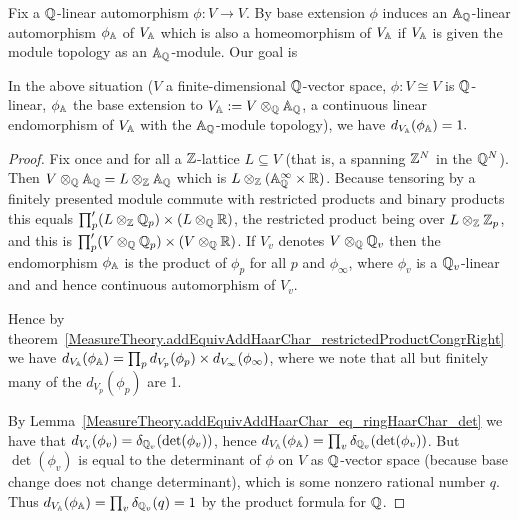  Fix a $\mathbb{Q}$-linear automorphism $\phi:V\to V$. By base extension $\phi$ induces
  an $\mathbb{A}_{\mathbb{Q}}$-linear automorphism $\phi_{\mathbb{A}}$ of $V_{\mathbb{A}}$ which is also a homeomorphism of $V_{\mathbb{A}}$
  if $V_{\mathbb{A}}$ is given the module topology as an $\mathbb{A}_{\mathbb{Q}}$-module. Our goal is

  \begin{theorem}
    \label{MeasureTheory.addHaarScalarFactor_tensor_adeles_eq_one}
    \leanok
    In the above situation ($V$ a finite-dimensional $\mathbb{Q}$-vector space, $\phi:V\cong V$ is
    $\mathbb{Q}$-linear, $\phi_{\mathbb{A}}$ the base extension to $V_{\mathbb{A}}:=V\otimes_{\mathbb{Q}}{\mathbb{A}_{\mathbb{Q}}}$, a continuous linear
    endomorphism of $V_{\mathbb{A}}$ with the $\mathbb{A}_{\mathbb{Q}}$-module topology), we have $d_{V_{\mathbb{A}}}(\phi_{\mathbb{A}})=1.$
  \end{theorem}
  \begin{proof}
    Fix once and for all a $\mathbb{Z}$-lattice $L\subseteq V$
    (that is, a spanning $\mathbb{Z}^N$ in the $\mathbb{Q}^N$). Then $V\otimes_{\mathbb{Q}}\mathbb{A}_{\mathbb{Q}}=L\otimes_{\mathbb{Z}}\mathbb{A}_{\mathbb{Q}}$
    which is $L\otimes_{\mathbb{Z}}(\mathbb{A}_{\mathbb{Q}}^\infty\times\mathbb{R})$.
    Because tensoring by a finitely presented module commute with restricted products and binary
    products this equals $\prod'_p(L\otimes_{\mathbb{Z}}\mathbb{Q}_p)\times(L\otimes_{\mathbb{Q}}\mathbb{R})$, the restricted
    product being over $L\otimes_{\mathbb{Z}}\mathbb{Z}_p$, and this is $\prod'_p(V\otimes_{\mathbb{Q}}\mathbb{Q}_p)\times(V\otimes_{\mathbb{Q}}\mathbb{R})$.
    If $V_v$ denotes $V\otimes_{\mathbb{Q}}\mathbb{Q}_v$ then the endomorphism $\phi_{\mathbb{A}}$ is the product of
    $\phi_p$ for all $p$ and $\phi_\infty$,
    where $\phi_v$ is a $\mathbb{Q}_v$-linear and and hence continuous automorphism of $V_v$.

    Hence by theorem~\ref{MeasureTheory.addEquivAddHaarChar_restrictedProductCongrRight}
    we have $d_{V_{\mathbb{A}}}(\phi_{\mathbb{A}})=\prod_p d_{V_p}(\phi_p)\times d_{V_\infty}(\phi_\infty)$,
    where we note that all but finitely many of the $d_{V_p}(\phi_p)$ are 1.

    By Lemma~\ref{MeasureTheory.addEquivAddHaarChar_eq_ringHaarChar_det} we have that
    $d_{V_v}(\phi_v)=\delta_{\mathbb{Q}_v}(\det(\phi_v))$, hence $d_{V_{\mathbb{A}}}(\phi_{\mathbb{A}})=\prod_v\delta_{\mathbb{Q}_v}(\det(\phi_v))$.
    But $\det(\phi_v)$ is equal to the determinant of $\phi$ on $V$ as $\mathbb{Q}$-vector space (because
    base change does not change determinant),
    which is some nonzero rational number $q$. Thus $d_{V_{\mathbb{A}}}(\phi_{\mathbb{A}})=\prod_v\delta_{\mathbb{Q}_v}(q)=1$
    by the product formula for $\mathbb{Q}$.
  \end{proof}

